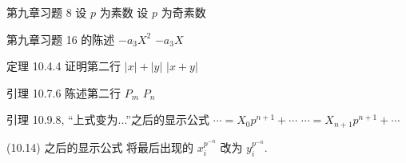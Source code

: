 \documentclass{AJerrata}
\begin{document}
\begin{Errata}
		\item[第九章习题 8]
		\Orig 设 $p$ 为素数
		\Corr 设 $p$ 为奇素数
		
		\item[第九章习题 16 的陈述]
		\Orig $-a_3 X^2$
		\Corr $-a_3 X$
		
		\item[定理 10.4.4 证明第二行]
		\Orig $|x|+|y|$
		\Corr $|x+y|$
		
		\item[引理 10.7.6 陈述第二行]
		\Orig $P_m$
		\Corr $P_n$
		
		\item[引理 10.9.8, ``上式变为...''之后的显示公式]
		\Orig $\cdots = X_0 p^{n+1} + \cdots$
		\Corr $\cdots = X_{n+1} p^{n+1} + \cdots$
		
		\item[(10.14) 之后的显示公式]
		将最后出现的 $x_i^{p^{-n}}$ 改为 $y_i^{p^{-n}}$.
	\end{Errata}
\end{document}
